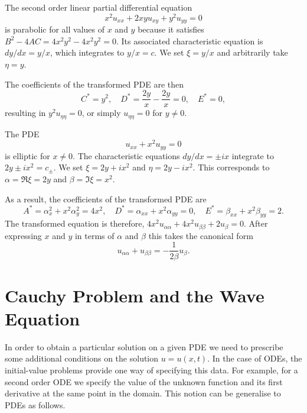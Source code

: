 \documentclass[11pt]{penrose}
\begin{document}
\begin{negg}
    The second order linear partial differential equation
    \begin{equation}
        x^2 u_{xx} + 2xy u_{xy} + y^2 u_{yy} = 0
    \end{equation}
    is parabolic for all values of $x$ and $y$ because it satisfies $B^2 - 4AC = 4x^2 y^2 - 4 x^2 y^2 = 0$. Its associated characteristic equation is $dy/dx = y/x$, which integrates to $y/x = c$. We set $\xi = y/x$ and arbitrarily take $\eta = y$.

    The coefficients of the transformed PDE are then
    \begin{equation}
        C^{*} = y^2,
        \quad
        D^{*} = \frac{2y}{x} - \frac{2y}{x} = 0,
        \quad
        E^{*} = 0,
    \end{equation}
    resulting in $y^2 u_{\eta\eta} = 0$, or simply $u_{\eta\eta} = 0$ for $y \neq 0$.
\end{negg}

\begin{negg}
    The PDE
    \begin{equation}
        u_{xx} + x^2 u_{yy} = 0
    \end{equation}
    is elliptic for $x \neq 0$. The characteristic equations $dy/dx = \pm i x$ integrate to $2y \pm ix^2 = c_{\pm}$. We set $\xi = 2y + ix^2$ and $\eta = 2y - ix^2$. This corresponds to $\alpha = \Re\xi = 2y$ and $\beta = \Im\xi = x^2$.

    As a result, the coefficients of the transformed PDE are
    \begin{equation}
        A^{*} = \alpha_x^2 + x^2 \alpha_y^2 = 4 x^2,
        \quad
        D^{*} = \alpha_{xx} + x^2 \alpha_{yy} = 0,
        \quad
        E^{*} = \beta_{xx} + x^2 \beta_{yy} = 2.
    \end{equation}
    The transformed equation is therefore, $4 x^2 u_{\alpha\alpha} + 4 x^2 u_{\beta\beta} + 2 u_{\beta} = 0$. After expressing $x$ and $y$ in terms of $\alpha$ and $\beta$ this takes the canonical form
    \begin{equation}
        u_{\alpha\alpha} + u_{\beta\beta} = -\frac{1}{2\beta} u_{\beta}.
    \end{equation}
\end{negg}

\section{Cauchy Problem and the Wave Equation}
In order to obtain a particular solution on a given PDE we need to prescribe some additional conditions on the solution $u = u(x,t)$. In the case of ODEs, the initial-value problems provide one way of specifying this data. For example, for a second order ODE we specify the value of the unknown function and its first derivative at the same point in the domain. This notion can be generalise to PDEs as follows.
\end{document}
